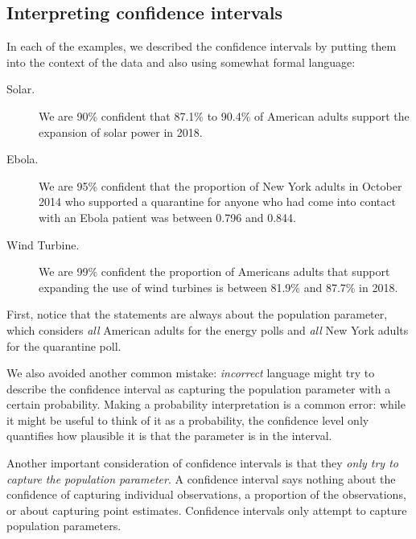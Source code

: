 \subsection{Interpreting confidence intervals}
\label{interpretingCIs}


In each of the examples, we described the confidence
intervals by putting them into the context of the data and also
using somewhat formal language:
\begin{description}
  \item[Solar.] We are 90\% confident that 87.1\% to 90.4\% of
      American adults support the expansion of solar power in 2018.
  \item[Ebola.] We are 95\% confident that the proportion
      of New York adults in October 2014 who supported a quarantine
      for anyone who had come into contact with an Ebola patient was
      between 0.796 and 0.844.
  \item[Wind Turbine.] We are 99\% confident the proportion of
      Americans adults that support expanding the use of wind
      turbines is between 81.9\% and 87.7\% in 2018.
\end{description}
First, notice that the statements are always about the population
parameter, which considers \emph{all} American adults for the
energy polls and \emph{all} New York adults for the quarantine poll.

We also avoided another common mistake:
\emph{incorrect} language might try to describe the confidence interval
as capturing the population parameter with a certain probability.
Making a probability interpretation is a common error:
while it might be useful to think of it as a probability,
the confidence level only quantifies how plausible
it is that the parameter is in the interval.

Another important consideration of confidence intervals is that they
\emph{only try to capture the population parameter}. A confidence
interval says nothing about the confidence of capturing individual
observations, a proportion of the observations, or about capturing
point estimates. Confidence intervals only attempt to capture
population parameters.







